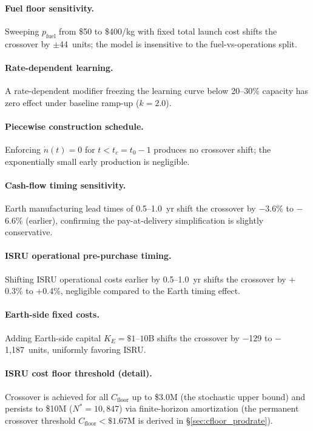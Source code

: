 

\paragraph{Fuel floor sensitivity.} Sweeping $p_{\mathrm{fuel}}$ from \$50 to \$400/kg with fixed total launch cost shifts the crossover by $\pm$44~units; the model is insensitive to the fuel-vs-operations split.

\paragraph{Rate-dependent learning.} A rate-dependent modifier freezing the learning curve below 20--30\% capacity has zero effect under baseline ramp-up ($k = 2.0$).

\paragraph{Piecewise construction schedule.} Enforcing $\dot{n}(t) = 0$ for $t < t_c = t_0 - 1$ produces no crossover shift; the exponentially small early production is negligible.

\paragraph{Cash-flow timing sensitivity.} Earth manufacturing lead times of 0.5--1.0~yr shift the crossover by $-$3.6\% to $-$6.6\% (earlier), confirming the pay-at-delivery simplification is slightly conservative.

\paragraph{ISRU operational pre-purchase timing.} Shifting ISRU operational costs earlier by 0.5--1.0~yr shifts the crossover by $+$0.3\% to $+$0.4\%, negligible compared to the Earth timing effect.

\paragraph{Earth-side fixed costs.} Adding Earth-side capital $K_E = \$1$--$10$B shifts the crossover by $-$129 to $-$1{,}187~units, uniformly favoring ISRU.

\paragraph{ISRU cost floor threshold (detail).} Crossover is achieved for all $C_{\mathrm{floor}}$ up to \$3.0M (the stochastic upper bound) and persists to \$10M ($N^* = 10{,}847$) via finite-horizon amortization (the permanent crossover threshold $C_{\mathrm{floor}} < \$1.67$M is derived in \S\ref{sec:cfloor_prodrate}).

